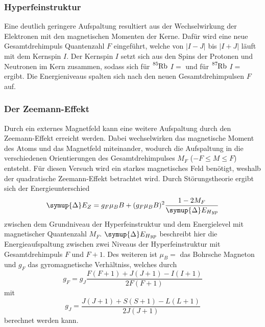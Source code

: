 \subsubsection{Hyperfeinstruktur}
Eine deutlich geringere Aufspaltung resultiert aus der Wechselwirkung der Elektronen mit den magnetischen Momenten der Kerne.
Dafür wird eine neue Gesamtdrehimpuls Quantenzahl $F$ eingeführt, welche von $|I - J|$ bis $|I + J|$ läuft mit dem Kernspin $I$.
Der Kernspin $I$ setzt sich aus den Spins der Protonen und Neutronen im Kern zusammen, sodass sich für $\ce{^{85}Rb}$ $I = $  und für $\ce{^{87}Rb}$
$I = $ ergibt. Die Energieniveaus spalten sich nach den neuen Gesamtdrehimpulsen $F$ auf. 

\subsubsection{Der Zeemann-Effekt}
Durch ein externes Magnetfeld kann eine weitere Aufspaltung durch den Zeemann-Effekt erreicht werden.
Dabei wechselwirken das magnetische Moment des Atoms und das Magnetfeld miteinander, wodurch die Aufspaltung in die
verschiedenen Orientierungen des Gesamtdrehimpulses $M_F$ ($-F \leq M \leq F$) entsteht. Für diesen Versuch wird ein starkes magnetisches Feld benötigt,
weshalb der quadratische Zeemann-Effekt betrachtet wird.
Durch Störungstheorie ergibt sich der Energieunterschied
\begin{equation}
    \symup{\Delta} E_Z = g_F \mu_B B + (g_F \mu_B B)^2 \frac{1-2M_F}{\symup{\Delta} E_{Hyp}}
\end{equation}
zwischen dem Grundniveau der Hyperfeinstruktur und dem Energielevel mit magnetischer Quantenzahl $M_F$. 
$\symup{\Delta} E_{Hyp}$ beschreibt hier die Energieaufspaltung zwischen zwei Niveaus der Hyperfeinstruktur mit Gesamtdrehimpuls $F$ und $F+1$.
Des weiteren ist $\mu_B = $ das Bohrsche Magneton und $g_F$ das gyromagnetische Verhältniss, welches durch
\begin{equation}
    g_F = g_J \frac{F(F+1)+J(J+1)-I(I+1)}{2F(F+1)}
\end{equation}
mit
\begin{equation}
    g_J = \frac{J(J+1)+S(S+1)-L(L+1)}{2J(J+1)}
\end{equation}
berechnet werden kann.

